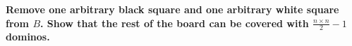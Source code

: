 \textbf{Remove one arbitrary black square and one arbitrary white square from $B$. Show that the rest of the board can be covered with $\frac{n \times n}{2}-1$ dominos.}\vspace{.2cm}

\textcolor{bibi}{}
\begin{quote}
\end{quote}